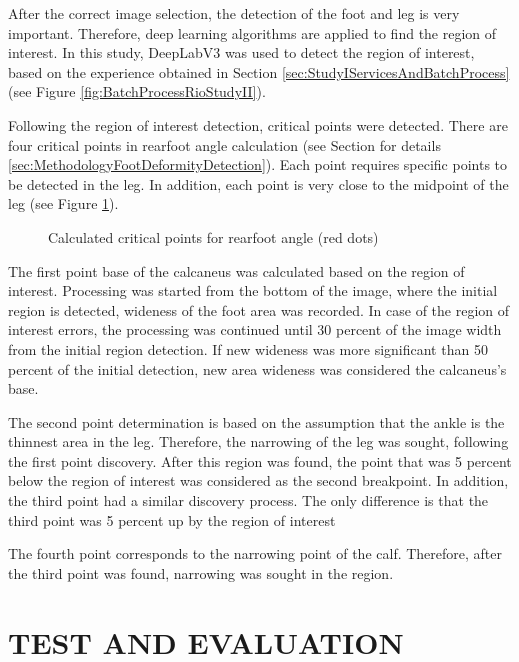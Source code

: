 After the correct image selection, the detection of the foot and leg is very important. Therefore, deep learning algorithms are applied to find the region of interest. In this study, DeepLabV3 was used to detect the region of interest, based on the experience obtained in Section \ref{sec:StudyIServicesAndBatchProcess} (see Figure \ref{fig:BatchProcessRioStudyII}).

Following the region of interest detection, critical points were detected. There are four critical points in rearfoot angle calculation (see Section for details \ref{sec:MethodologyFootDeformityDetection}). Each point requires specific points to be detected in the leg. In addition, each point is very close to the midpoint of the leg (see Figure \ref{fig:BatchProcessDotsStudyII}).

\begin{figure}[htbp]
\centering
{}
\caption{Calculated critical points for rearfoot angle (red dots)}
\label{fig:BatchProcessDotsStudyII}
\end{figure}

The first point base of the calcaneus was calculated based on the region of interest. Processing was started from the bottom of the image, where the initial region is detected, wideness of the foot area was recorded. In case of the region of interest errors, the processing was continued until 30 percent of the image width from the initial region detection. If new wideness was more significant than 50 percent of the initial detection, new area wideness was considered the calcaneus's base.

The second point determination is based on the assumption that the ankle is the thinnest area in the leg. Therefore, the narrowing of the leg was sought, following the first point discovery. After this region was found, the point that was 5 percent below the region of interest was considered as the second breakpoint. In addition, the third point had a similar discovery process. The only difference is that the third point was 5 percent up by the region of interest

The fourth point corresponds to the narrowing point of the calf. Therefore, after the third point was found, narrowing was sought in the region.

\section{TEST AND EVALUATION}\label{sec:StudyIITestAndEvaluation}

